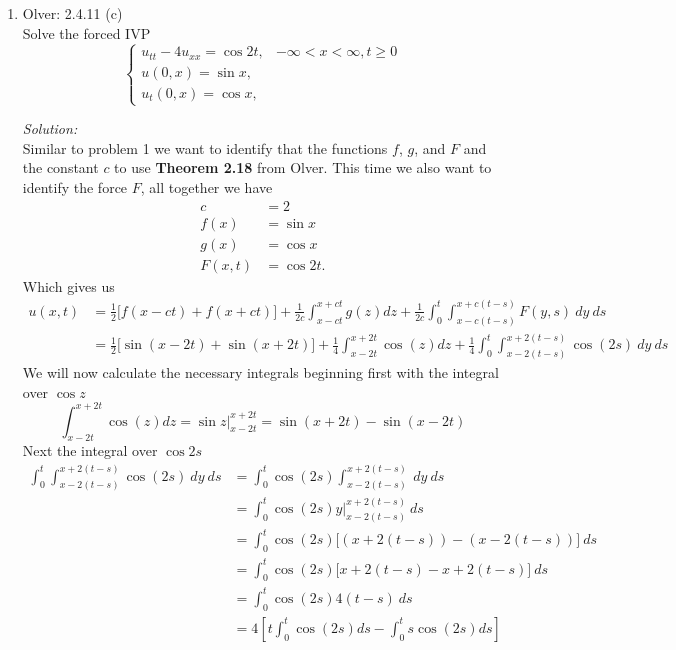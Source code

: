 \documentclass[10pt]{amsart}
\theoremstyle{nonumberplain}
\begin{document}
\begin{enumerate}[label={\bf {\arabic*}:}]
\begin{enumerate}
\end{enumerate}

\newpage


\item Olver: 2.4.11 (c) \\
Solve the forced IVP
$$
\begin{cases}
u_{tt} - 4 u_{xx} = \cos 2t, &-\infty < x < \infty, t \geq 0\\
u(0, x) = \sin x, \\
u_t(0, x) = \cos x,
\end{cases}
$$

\noindent
\textit{Solution:} \\
Similar to problem 1 we want to identify that the functions $f$, $g$, and $F$ and the constant $c$ to use \textbf{Theorem 2.18} from Olver.
This time we also want to identify the force $F$, all together we have
\begin{align*}
c &= 2 \\
f(x) &= \sin x \\
g(x) &= \cos x \\
F(x, t) &= \cos 2t.
\end{align*}
Which gives us
\begin{align*}
u(x, t) &= \frac 1 2 \Big[ f(x - ct) + f(x + ct) \Big] + \frac 1{2c} \int_{x - ct}^{x + ct} g(z) dz + \frac 1{2c} \int_0^t \int_{x - c (t - s)}^{x + c(t - s)} F(y, s) \: dy \: ds \\
	&= \frac 1 2 \Big[ \sin(x - 2t) + \sin(x + 2t) \Big] + \frac 1 4 \int_{x - 2t}^{x + 2t} \cos (z) dz + \frac 1 4 \int_0^t \int_{x - 2(t - s)}^{x + 2(t - s)} \cos (2s) \: dy \: ds
\end{align*}
We will now calculate the necessary integrals beginning first with the integral over $\cos z$
$$
\int_{x - 2t}^{x + 2t} \cos (z) dz
	= \sin z \big|_{x - 2t}^{x + 2t}
	= \sin (x + 2t) - \sin(x - 2t)
$$
Next the integral over $\cos 2s$
\begin{align*}
\int_0^t \int_{x - 2(t - s)}^{x + 2(t - s)} \cos (2s) \: dy \: ds
	&= \int_0^t  \cos (2s) \int_{x - 2(t - s)}^{x + 2(t - s)} \: dy \: ds \\
	&= \int_0^t \cos (2s) y \Big|_{x - 2(t - s)}^{x + 2(t - s)} \: ds \\
	&= \int_0^t \cos (2s)\Big[(x + 2(t - s)) - (x - 2(t - s)) \Big] \: ds \\
	&= \int_0^t \cos (2s)\Big[ x + 2(t - s)  - x + 2(t - s) \Big] \: ds \\
	&= \int_0^t \cos (2s)4(t - s) \: ds \\
	&= 4\left[ t \int_0^t \cos (2s)ds - \int_0^t s \cos (2s) ds \right] \\

\end{align*}
\end{enumerate}
\end{document}
